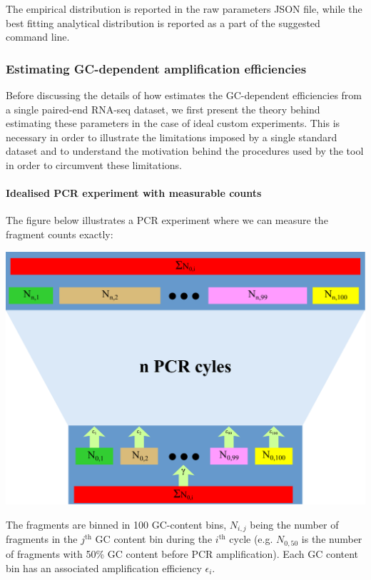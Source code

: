 The empirical distribution is reported in the raw parameters JSON file, while the best fitting analytical distribution is reported as a part of the suggested \rlsim command line.

\subsubsection{Estimating GC-dependent amplification efficiencies}

Before discussing the details of how \effest estimates the GC-dependent efficiencies from a single paired-end RNA-seq dataset, we first present the theory behind estimating these parameters in the case of ideal custom experiments. This is necessary in order to illustrate the limitations imposed by a single standard dataset and to understand the motivation behind the procedures used by the tool in order to circumvent these limitations.

\paragraph{Idealised PCR experiment with measurable counts}

The figure below illustrates a PCR experiment where we can measure the fragment counts exactly:

\begin{center}
\includegraphics[scale=0.36]{pix/pcr_model.pdf}
\end{center}

The fragments are binned in 100 GC-content bins, $N_{i,j}$ being the number of fragments in the $j^{\mathrm{th}}$ GC content bin during the $i^{\mathrm{th}}$ cycle (e.g. $N_{0,50}$ is the number of fragments with 50\% GC content before PCR amplification). Each GC content bin has an associated amplification efficiency $\epsilon_i$.

